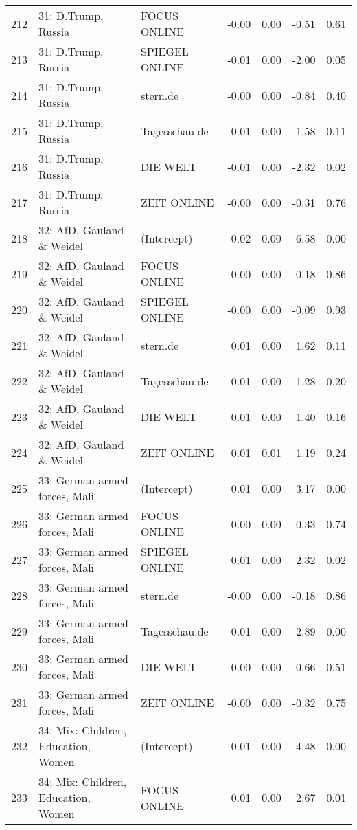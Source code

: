 \begin{table}[ht]
{\begin{tabular}{rllrrrr}
  212 & 31: D.Trump, Russia & FOCUS ONLINE & -0.00 & 0.00 & -0.51 & 0.61 \\ 
  213 & 31: D.Trump, Russia & SPIEGEL ONLINE & -0.01 & 0.00 & -2.00 & 0.05 \\ 
  214 & 31: D.Trump, Russia & stern.de & -0.00 & 0.00 & -0.84 & 0.40 \\ 
  215 & 31: D.Trump, Russia & Tagesschau.de & -0.01 & 0.00 & -1.58 & 0.11 \\ 
  216 & 31: D.Trump, Russia & DIE WELT & -0.01 & 0.00 & -2.32 & 0.02 \\ 
  217 & 31: D.Trump, Russia & ZEIT ONLINE & -0.00 & 0.00 & -0.31 & 0.76 \\ 
  218 & 32: AfD, Gauland \& Weidel & (Intercept) & 0.02 & 0.00 & 6.58 & 0.00 \\ 
  219 & 32: AfD, Gauland \& Weidel & FOCUS ONLINE & 0.00 & 0.00 & 0.18 & 0.86 \\ 
  220 & 32: AfD, Gauland \& Weidel & SPIEGEL ONLINE & -0.00 & 0.00 & -0.09 & 0.93 \\ 
  221 & 32: AfD, Gauland \& Weidel & stern.de & 0.01 & 0.00 & 1.62 & 0.11 \\ 
  222 & 32: AfD, Gauland \& Weidel & Tagesschau.de & -0.01 & 0.00 & -1.28 & 0.20 \\ 
  223 & 32: AfD, Gauland \& Weidel & DIE WELT & 0.01 & 0.00 & 1.40 & 0.16 \\ 
  224 & 32: AfD, Gauland \& Weidel & ZEIT ONLINE & 0.01 & 0.01 & 1.19 & 0.24 \\ 
  225 & 33: German armed forces, Mali & (Intercept) & 0.01 & 0.00 & 3.17 & 0.00 \\ 
  226 & 33: German armed forces, Mali & FOCUS ONLINE & 0.00 & 0.00 & 0.33 & 0.74 \\ 
  227 & 33: German armed forces, Mali & SPIEGEL ONLINE & 0.01 & 0.00 & 2.32 & 0.02 \\ 
  228 & 33: German armed forces, Mali & stern.de & -0.00 & 0.00 & -0.18 & 0.86 \\ 
  229 & 33: German armed forces, Mali & Tagesschau.de & 0.01 & 0.00 & 2.89 & 0.00 \\ 
  230 & 33: German armed forces, Mali & DIE WELT & 0.00 & 0.00 & 0.66 & 0.51 \\ 
  231 & 33: German armed forces, Mali & ZEIT ONLINE & -0.00 & 0.00 & -0.32 & 0.75 \\ 
  232 & 34: Mix: Children, Education, Women & (Intercept) & 0.01 & 0.00 & 4.48 & 0.00 \\ 
  233 & 34: Mix: Children, Education, Women & FOCUS ONLINE & 0.01 & 0.00 & 2.67 & 0.01 \\ 

\end{tabular}}
\end{table}
